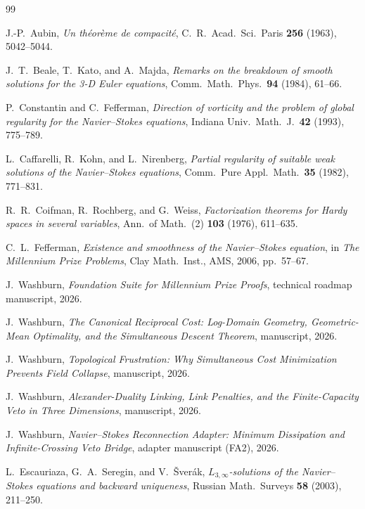 \documentclass[12pt, reqno]{amsart}
\theoremstyle{definition}
\theoremstyle{remark}
\numberwithin{equation}{section}
\begin{document}
\begin{thebibliography}{99}

J.-P.~Aubin, \emph{Un th\'eor\`eme de compacit\'e},
C.~R.~Acad.~Sci.~Paris \textbf{256} (1963), 5042--5044.

J.~T.~Beale, T.~Kato, and A.~Majda,
\emph{Remarks on the breakdown of smooth solutions for the 3-D Euler
equations},
Comm.\ Math.\ Phys.\ \textbf{94} (1984), 61--66.

P.~Constantin and C.~Fefferman,
\emph{Direction of vorticity and the problem of global regularity for
the Navier--Stokes equations},
Indiana Univ.\ Math.\ J.\ \textbf{42} (1993), 775--789.

L.~Caffarelli, R.~Kohn, and L.~Nirenberg,
\emph{Partial regularity of suitable weak solutions of the
Navier--Stokes equations},
Comm.\ Pure Appl.\ Math.\ \textbf{35} (1982), 771--831.

R.~R.~Coifman, R.~Rochberg, and G.~Weiss,
\emph{Factorization theorems for Hardy spaces in several variables},
Ann.\ of Math.\ (2) \textbf{103} (1976), 611--635.

C.~L.~Fefferman,
\emph{Existence and smoothness of the Navier--Stokes equation},
in \emph{The Millennium Prize Problems}, Clay Math.\ Inst., AMS, 2006,
pp.~57--67.

J.~Washburn,
\emph{Foundation Suite for Millennium Prize Proofs},
technical roadmap manuscript, 2026.

J.~Washburn,
\emph{The Canonical Reciprocal Cost: Log-Domain Geometry,
Geometric-Mean Optimality, and the Simultaneous Descent Theorem},
manuscript, 2026.

J.~Washburn,
\emph{Topological Frustration: Why Simultaneous Cost Minimization
Prevents Field Collapse},
manuscript, 2026.

J.~Washburn,
\emph{Alexander-Duality Linking, Link Penalties, and the
Finite-Capacity Veto in Three Dimensions},
manuscript, 2026.

J.~Washburn,
\emph{Navier--Stokes Reconnection Adapter: Minimum Dissipation and
Infinite-Crossing Veto Bridge},
adapter manuscript (FA2), 2026.

L.~Escauriaza, G.~A.~Seregin, and V.~\v{S}ver\'ak,
\emph{$L_{3,\infty}$-solutions of the Navier--Stokes equations and
backward uniqueness},
Russian Math.\ Surveys \textbf{58} (2003), 211--250.


\end{thebibliography}
\end{document}
